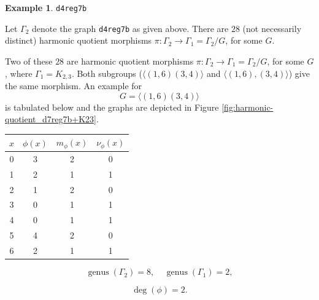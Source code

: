 \documentclass[12pt,letterpaper]{article}
\theoremstyle{definition}
\newtheorem{example}[theorem]{Example}
\DeclareMathOperator{\genus}{genus}
\begin{document}
\begin{example}%
\label{example:d4reg7b}
 {\tt d4reg7b}\newline
{\rm  
  Let $\Gamma_2$ denote the graph {\tt d4reg7b} as given above.
There are $28$ (not necessarily distinct) harmonic quotient morphisms
$\pi: \Gamma_2\to \Gamma_1=\Gamma_2/G$,
for some $G$.

Two of these $28$ are harmonic quotient morphisms
$\pi: \Gamma_2\to \Gamma_1=\Gamma_2/G$,
for some $G$, where $\Gamma_1=K_{2,3}$. Both subgroups
($\langle (1,6)(3,4)\rangle$ and $\langle (1,6),(3,4)\rangle$) give the same morphism.
An example for
\[
G = \langle (1,6)(3,4) \rangle
\]
is tabulated below and the graphs are depicted in
Figure \ref{fig:harmonic-quotient_d7reg7b+K23}.

\begin{center}
\begin{tabular}{c|c|c|c}  
  $x$ & $\phi(x)$ & $m_\phi(x)$ & $\nu_\phi(x)$ \\ \hline
  0   &    3   &        2         &  0   \\ 
  1   &    2   &        1         &  1  \\ 
  2   &    1   &        2         &  0  \\ 
  3   &    0   &        1         &  1  \\ 
  4   &    0   &        1         &  1   \\
  5   &    4   &        2         &  0   \\
  6   &    2   &        1         &  1   \\   
\end{tabular}
\end{center}

\[
  \genus(\Gamma_2) =8,\ \ \ \ \
  \genus(\Gamma_1) =2,
\]

\[
\deg(\phi) =2.
\]

}
\end{example}
\end{document}
